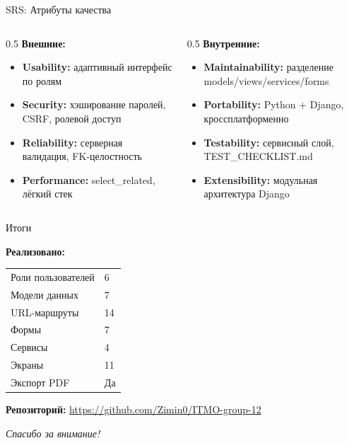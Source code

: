 \documentclass[aspectratio=169,14pt]{beamer}
\begin{document}
\begin{frame}{SRS: Атрибуты качества}
\small
\begin{columns}
\begin{column}{0.5\textwidth}
\textbf{Внешние:}
\begin{itemize}
    \item \textbf{Usability:} адаптивный интерфейс по ролям
    \item \textbf{Security:} хэширование паролей, CSRF, ролевой доступ
    \item \textbf{Reliability:} серверная валидация, FK-целостность
    \item \textbf{Performance:} select\_related, лёгкий стек
\end{itemize}
\end{column}
\begin{column}{0.5\textwidth}
\textbf{Внутренние:}
\begin{itemize}
    \item \textbf{Maintainability:} разделение models/views/services/forms
    \item \textbf{Portability:} Python + Django, кроссплатформенно
    \item \textbf{Testability:} сервисный слой, TEST\_CHECKLIST.md
    \item \textbf{Extensibility:} модульная архитектура Django
\end{itemize}
\end{column}
\end{columns}
\end{frame}

\begin{frame}{Итоги}
\begin{center}
\textbf{Реализовано:}

\vspace{0.3cm}
\begin{tabular}{ll}
\toprule
Роли пользователей & 6 \\
Модели данных & 7 \\
URL-маршруты & 14 \\
Формы & 7 \\
Сервисы & 4 \\
Экраны & 11 \\
Экспорт PDF & Да \\
\bottomrule
\end{tabular}

\vspace{0.5cm}
\textbf{Репозиторий:} \url{https://github.com/Zimin0/ITMO-group-12}

\vspace{0.3cm}
\textit{Спасибо за внимание!}
\end{center}
\end{frame}
\end{document}
